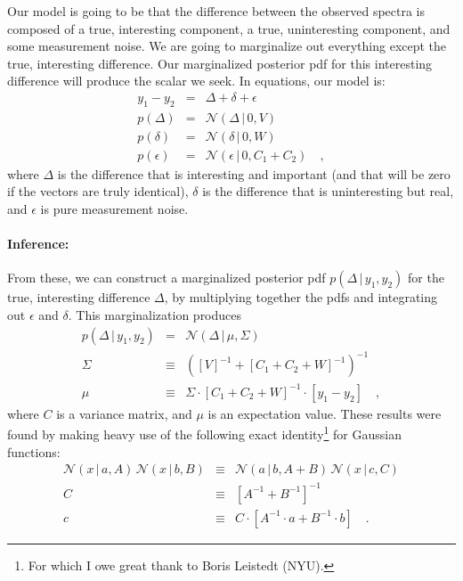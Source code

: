 \documentclass[12pt,letterpaper]{article}
\newcommand{\inv}[1]{{#1}^{-1}}
\newcommand{\given}{\,|\,}
\newcommand{\normal}{\mathcal{N}}
\begin{document}
Our model is going to be that the difference between the observed
spectra is composed of a true, interesting component, a true,
uninteresting component, and some measurement noise. We are going to
marginalize out everything except the true, interesting
difference. Our marginalized posterior pdf for this interesting
difference will produce the scalar we seek. In equations, our model is:
\begin{eqnarray}
  y_1 - y_2 &=& \Delta + \delta + \epsilon
\\
  p(\Delta) &=& \normal(\Delta\given 0,V)
\\
  p(\delta) &=& \normal(\delta\given 0,W)
\\
  p(\epsilon) &=& \normal(\epsilon\given 0,C_1+C_2)
\quad ,
\end{eqnarray}
where $\Delta$ is the difference that is interesting and important
(and that will be zero if the vectors are truly identical), $\delta$
is the difference that is uninteresting but real, and $\epsilon$ is
pure measurement noise.

\paragraph{Inference:}
From these, we can construct a marginalized posterior pdf
$p(\Delta\given y_1,y_2)$ for the true, interesting difference
$\Delta$, by multiplying together the pdfs and integrating out
$\epsilon$ and $\delta$. This marginalization produces
\begin{eqnarray}
  p(\Delta\given y_1,y_2) &=& \normal(\Delta\given\mu,\Sigma)
\\
  \Sigma &\equiv& \inv{(\inv{[V]} + \inv{[C_1 + C_2 + W]})}
\\
  \mu &\equiv& \Sigma\cdot\inv{[C_1 + C_2 + W]}\cdot[y_1-y_2]
\quad ,
\end{eqnarray}
where $C$ is a variance matrix, and $\mu$ is an expectation value.
These results were found by making heavy use of the following
exact identity\footnote{For which I owe great thank to Boris
Leistedt (NYU).} for Gaussian functions:
\begin{eqnarray}
  \normal(x\given a,A)\,\normal(x\given b,B) &\equiv& \normal(a\given b,A+B)\,\normal(x\given c,C)
\\
  C &\equiv& \inv{[\inv{A} + \inv{B}]}
\\
  c &\equiv& C\cdot [\inv{A}\cdot a + \inv{B}\cdot b]
\quad .
\end{eqnarray}
\end{document}
